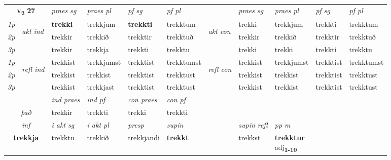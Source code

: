 \noindent
\begin{tabular}{lllllllllll} \toprule
\multicolumn{2}{c}{\textbf{v{\textsubscript{2}}} \Large{\textbf{27}}}  &  \textit{praes sg}  & \textit{praes pl}  &\textit{ pf sg} & \textit{pf pl} &  &  \textit{praes sg}  & \textit{praes pl}  & \textit{pf sg} & \textit{pf pl } \\*
	\cmidrule{3-6} \cmidrule{8-11}
 {\textit{1p}} & \multirow{3}{*}{\begin{turn}{90}\textit{akt ind}\end{turn}} & \textbf{trekki} & trekkjum & \textbf{trekkti} & trekktum & \multirow{3}{*}{\begin{turn}{90}\textit{akt con}\end{turn}} &trekki & trekkjum & trekkti & trekktum\\*
 {\textit{2p}} &  &  trekkir  & trekkið & trekktir & trekktuð & & trekkir & trekkið & trekktir & trekktuð \\*
{\textit{3p}} &  & trekkir & trekkja & trekkti & trekktu & & trekki & trekki& trekkti & trekktu \\*
\cmidrule{3-6} \cmidrule{8-11}
 {\textit{1p}} & \multirow{3}{*}{\begin{turn}{90}\textit{refl ind}\end{turn}}  & trekkist & trekkjumst & trekktist & trekktumst & \multirow{3}{*}{\begin{turn}{90}\textit{refl con}\end{turn}}  &trekkist & trekkjumst & trekktist & trekktumst \\*
 {\textit{2p}} &  & trekkist & trekkist & trekktist & trekktust & &trekkist & trekkist & trekktist & trekktust \\*
 {\textit{3p}}  & & trekkist & trekkjast & trekktist & trekktust & & trekkist & trekkist& trekktist & trekktust \\*
\cmidrule{3-6} \cmidrule{8-11}

   & &  \textit{ind praes} & \textit{ind pf} & \textit{con praes} & \textit{con pf} \\*
\multicolumn{2}{c}{ \textit{það} } & trekkir & trekkti & trekki & trekkti \\*

\cmidrule{3-9}
   \multicolumn{2}{c}{\textit{inf}}  & \textit{i akt sg} & \textit{i akt pl}   & \textit{presp} & \textit{supin} && \textit{supin refl} & \textit{pp m} \\*
  \multicolumn{2}{c}{\textbf{trekkja}} & trekktu  & trekkið   & trekkjandi &  \textbf{trekkt} && trekkst & \specialcell{\textbf{trekktur} \\ adj\textbf{\textsubscript{1-10}}} \\*
\end{tabular}

